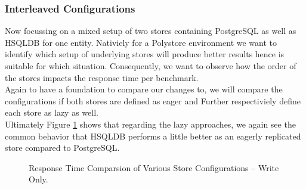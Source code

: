 \subsubsection{Interleaved Configurations}
Now focussing on a mixed setup of two stores containing PostgreSQL as well as HSQLDB for one entity.
Nativiely for a Polystore environment we want to identify which setup of underlying stores will produce better results hence is suitable for which situation.
Consequently, we want to observe how the order of the stores impacts the response time per benchmark.\\
Again to have a foundation to compare our changes to, we will compare the configurations if both stores are defined as eager and Further
respectiviely define each store as lazy as well.\\
Ultimately Figure \ref{fig:psqlhsqlresponse} shows that regarding the lazy approaches, we again see the common behavior that HSQLDB performs a little better as an eagerly replicated
store compared to PostgreSQL.


\begin{figure}[t] 
    \caption{Response Time Comparsion of Various Store Configurations -- Write Only.}
    \label{fig:psqlhsqlresponse}
    \end{figure}



